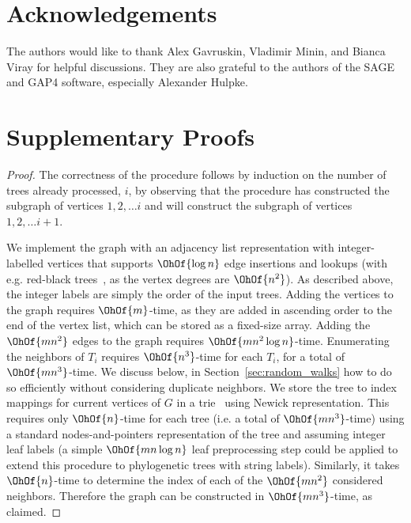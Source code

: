 \documentclass[10pt,twoside,leqno,twocolumn]{article}
\begin{document}
\section{Acknowledgements}
The authors would like to thank Alex Gavruskin, Vladimir Minin, and Bianca Viray for helpful discussions.
They are also grateful to the authors of the SAGE and GAP4 software, especially Alexander Hulpke.




\appendix

\section{Supplementary Proofs}

\constructgraph*
\begin{proof}
	The correctness of the procedure follows by induction on the number of trees already processed, $i$, by observing that the procedure has constructed the subgraph of vertices $1, 2,  \ldots i$ and will construct the subgraph of vertices $1, 2, \ldots i+1$.

	We implement the graph with an adjacency list representation with integer-labelled vertices that supports $\OhOf{\log n}$ edge insertions and lookups (with e.g. red-black trees~\cite{guibas1978dichromatic}, as the vertex degrees are $\OhOf{n^2}$).
	As described above, the integer labels are simply the order of the input trees.
	Adding the vertices to the graph requires $\OhOf{m}$-time, as they are added in ascending order to the end of the vertex list, which can be stored as a fixed-size array.
	Adding the $\OhOf{mn^2}$ edges to the graph requires $\OhOf{mn^2 \log n}$-time.
	Enumerating the neighbors of $T_i$ requires $\OhOf{n^3}$-time for each $T_i$, for a total of $\OhOf{mn^3}$-time.
	We discuss below, in Section~\ref{sec:random_walks} how to do so efficiently without considering duplicate neighbors.
	We store the tree to index mappings for current vertices of $G$ in a trie~\cite{fredkin1960trie} using Newick representation.
	This requires only $\OhOf{n}$-time for each tree (i.e. a total of $\OhOf{mn^3}$-time) using a standard nodes-and-pointers representation of the tree and assuming integer leaf labels (a simple $\OhOf{mn\log n}$ leaf preprocessing step could be applied to extend this procedure to phylogenetic trees with string labels).
	Similarly, it takes $\OhOf{n}$-time to determine the index of each of the $\OhOf{mn^2}$ considered neighbors.
	Therefore the graph can be constructed in $\OhOf{mn^3}$-time, as claimed.
\end{proof}
\end{document}
